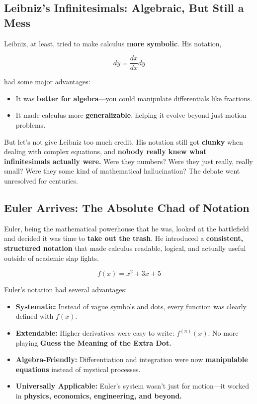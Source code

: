 \subsection{Leibniz’s Infinitesimals: Algebraic, But Still a Mess}  

Leibniz, at least, tried to make calculus \textbf{more symbolic}. His notation,  

\[
dy = \frac{dx}{dx} dy
\]

had some major advantages:

\begin{itemize}
    \item It was \textbf{better for algebra}—you could manipulate differentials like fractions.
    \item It made calculus more \textbf{generalizable}, helping it evolve beyond just motion problems.
\end{itemize}

But let’s not give Leibniz too much credit. His notation still got \textbf{clunky} when dealing with complex equations, and \textbf{nobody really knew what infinitesimals actually were.} Were they numbers? Were they just really, really small? Were they some kind of mathematical hallucination? The debate went unresolved for centuries.

\subsection{Euler Arrives: The Absolute Chad of Notation}  

Euler, being the mathematical powerhouse that he was, looked at the battlefield and decided it was time to \textbf{take out the trash}. He introduced a \textbf{consistent, structured notation} that made calculus readable, logical, and actually useful outside of academic slap fights.

\[
f(x) = x^2 + 3x + 5
\]

Euler’s notation had several advantages:

\begin{itemize}
    \item \textbf{Systematic:} Instead of vague symbols and dots, every function was clearly defined with \( f(x) \).  
    \item \textbf{Extendable:} Higher derivatives were easy to write: \( f^{(n)}(x) \). No more playing \textbf{Guess the Meaning of the Extra Dot.}  
    \item \textbf{Algebra-Friendly:} Differentiation and integration were now \textbf{manipulable equations} instead of mystical processes.  
    \item \textbf{Universally Applicable:} Euler’s system wasn’t just for motion—it worked in \textbf{physics, economics, engineering, and beyond.}  
\end{itemize}

